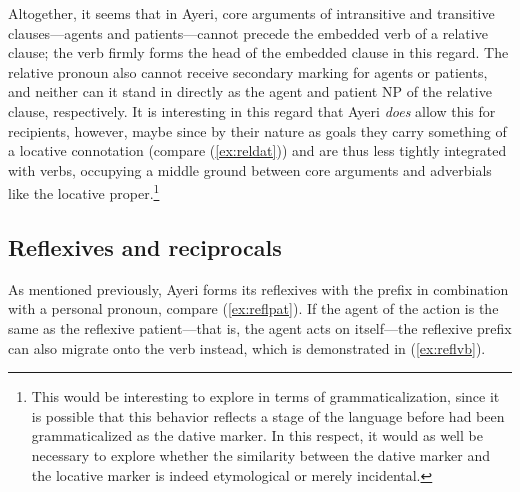 Altogether, it seems that in Ayeri, core arguments of intransitive and
transitive clauses---agents and patients---cannot precede the embedded verb of
a relative clause; the verb firmly forms the head of the embedded clause in
this regard. The relative pronoun also cannot receive secondary marking for
agents or patients, and neither can it stand in directly as the agent and
patient NP of the relative clause, respectively. It is interesting in this
regard that Ayeri \emph{does} allow this for recipients, however, maybe since
by their nature as goals they carry something of a locative connotation
(compare (\ref{ex:reldat})) and are thus less tightly integrated with verbs,
occupying a middle ground between core arguments and adverbials like the
locative proper.\footnote{This would be interesting to explore in terms of
grammaticalization, since it is possible that this behavior reflects a stage of
the language before  had been grammaticalized as the dative
marker. In this respect, it would as well be necessary to explore whether the
similarity between the dative marker  and the locative marker
 is indeed etymological or merely incidental.}


\subsection{Reflexives and reciprocals}
\label{subsec:reflrec}

As mentioned previously, Ayeri forms its reflexives with the prefix 
 in combination with a personal pronoun, compare 
(\ref{ex:reflpat}). If the agent of the action is the same as the reflexive 
patient---that is, the agent acts on itself---the reflexive prefix can also 
migrate onto the verb instead, which is demonstrated in (\ref{ex:reflvb}).

